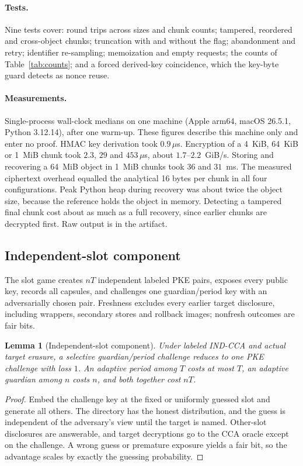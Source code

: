 \documentclass[pdflatex,sn-mathphys-num]{sn-jnl}
\theoremstyle{plain}
\newtheorem{lemma}[theorem]{Lemma}
\theoremstyle{definition}
\begin{document}
\paragraph{Tests.}
Nine tests cover: round trips across sizes and chunk counts; tampered, reordered and cross-object chunks; truncation with and without the flag; abandonment and retry; identifier re-sampling; memoization and empty requests; the counts of Table~\ref{tab:counts}; and a forced derived-key coincidence, which the key-byte guard detects as nonce reuse.

\paragraph{Measurements.}
Single-process wall-clock medians on one machine (Apple arm64, macOS 26.5.1, Python 3.12.14), after one warm-up. These figures describe this machine only and enter no proof. HMAC key derivation took $0.9\,\mu$s. Encryption of a 4~KiB, 64~KiB or 1~MiB chunk took $2.3$, $29$ and $453\,\mu$s, about $1.7$--$2.2$~GiB/s. Storing and recovering a 64~MiB object in 1~MiB chunks took $36$ and $31$~ms. The measured ciphertext overhead equalled the analytical 16 bytes per chunk in all four configurations. Peak Python heap during recovery was about twice the object size, because the reference holds the object in memory. Detecting a tampered final chunk cost about as much as a full recovery, since earlier chunks are decrypted first. Raw output is in the artifact.

\subsection{Independent-slot component}\label{sec:slots}
The slot game creates $nT$ independent labeled PKE pairs, exposes every public key, records all capsules, and challenges one guardian/period key with an adversarially chosen pair. Freshness excludes every earlier target disclosure, including wrappers, secondary stores and rollback images; nonfresh outcomes are fair bits.

\begin{lemma}[Independent-slot component]\label{lem:slot}
Under labeled IND-CCA and actual target erasure, a selective guardian/period challenge reduces to one PKE challenge with loss $1$. An adaptive period among $T$ costs at most $T$, an adaptive guardian among $n$ costs $n$, and both together cost $nT$.
\end{lemma}
\begin{proof}
Embed the challenge key at the fixed or uniformly guessed slot and generate all others. The directory has the honest distribution, and the guess is independent of the adversary's view until the target is named. Other-slot disclosures are answerable, and target decryptions go to the CCA oracle except on the challenge. A wrong guess or premature exposure yields a fair bit, so the advantage scales by exactly the guessing probability.
\end{proof}
\end{document}
